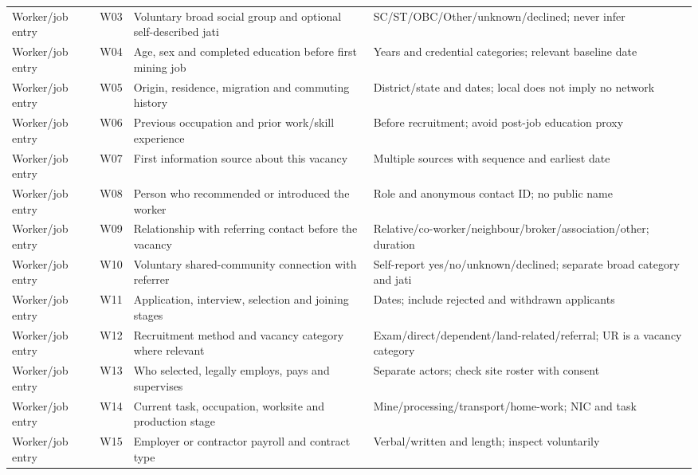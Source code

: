\documentclass[11pt,a4paper]{report}
\begin{document}
\begin{longtable}{>{\raggedright\arraybackslash}p{1.8cm}l>{\raggedright\arraybackslash}p{7.5cm}>{\raggedright\arraybackslash}p{4.5cm}}
Worker/\allowbreak{}job entry & W03 & Voluntary broad social group and optional self-described jati & SC/\allowbreak{}ST/\allowbreak{}OBC/\allowbreak{}Other/\allowbreak{}unknown/\allowbreak{}declined; never infer \\
Worker/\allowbreak{}job entry & W04 & Age, sex and completed education before first mining job & Years and credential categories; relevant baseline date \\
Worker/\allowbreak{}job entry & W05 & Origin, residence, migration and commuting history & District/\allowbreak{}state and dates; local does not imply no network \\
Worker/\allowbreak{}job entry & W06 & Previous occupation and prior work/\allowbreak{}skill experience & Before recruitment; avoid post-job education proxy \\
Worker/\allowbreak{}job entry & W07 & First information source about this vacancy & Multiple sources with sequence and earliest date \\
Worker/\allowbreak{}job entry & W08 & Person who recommended or introduced the worker & Role and anonymous contact ID; no public name \\
Worker/\allowbreak{}job entry & W09 & Relationship with referring contact before the vacancy & Relative/\allowbreak{}co-worker/\allowbreak{}neighbour/\allowbreak{}broker/\allowbreak{}association/\allowbreak{}other; duration \\
Worker/\allowbreak{}job entry & W10 & Voluntary shared-community connection with referrer & Self-report yes/\allowbreak{}no/\allowbreak{}unknown/\allowbreak{}declined; separate broad category and jati \\
Worker/\allowbreak{}job entry & W11 & Application, interview, selection and joining stages & Dates; include rejected and withdrawn applicants \\
Worker/\allowbreak{}job entry & W12 & Recruitment method and vacancy category where relevant & Exam/\allowbreak{}direct/\allowbreak{}dependent/\allowbreak{}land-related/\allowbreak{}referral; UR is a vacancy category \\
Worker/\allowbreak{}job entry & W13 & Who selected, legally employs, pays and supervises & Separate actors; check site roster with consent \\
Worker/\allowbreak{}job entry & W14 & Current task, occupation, worksite and production stage & Mine/\allowbreak{}processing/\allowbreak{}transport/\allowbreak{}home-work; NIC and task \\
Worker/\allowbreak{}job entry & W15 & Employer or contractor payroll and contract type & Verbal/\allowbreak{}written and length; inspect voluntarily \\

\end{longtable}
\end{document}

